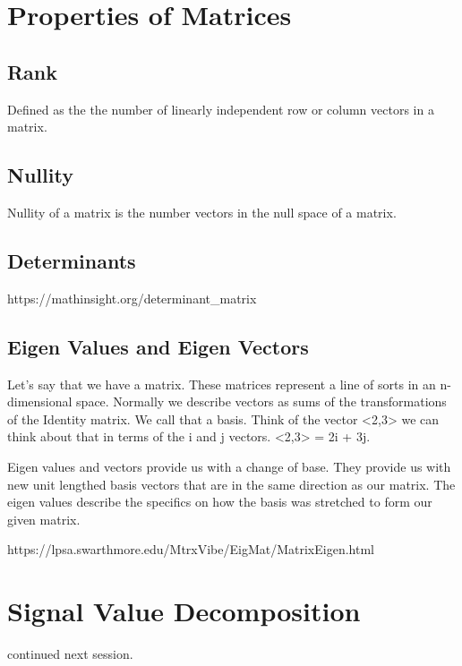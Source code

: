 \section{Properties of Matrices}

\subsection{Rank}
Defined as the the number of linearly independent row or column vectors in a matrix.

\subsection{Nullity}
Nullity of a matrix is the number vectors in the null space of a matrix.

\subsection{Determinants}
https://mathinsight.org/determinant\_matrix

\subsection{Eigen Values and Eigen Vectors}
Let's say that we have a matrix. These matrices represent a line of sorts in an n-dimensional space. Normally we describe vectors as sums of the transformations of the Identity matrix. We call that a basis. Think of the vector <2,3> we can think about that in terms of the i and j vectors. <2,3> = 2i + 3j. 

Eigen values and vectors provide us with a change of base. They provide us with new unit lengthed basis vectors that are in the same direction as our matrix. The eigen values describe the specifics on how the basis was stretched to form our given matrix.

https://lpsa.swarthmore.edu/MtrxVibe/EigMat/MatrixEigen.html

\section{Signal Value Decomposition}
continued next session.

